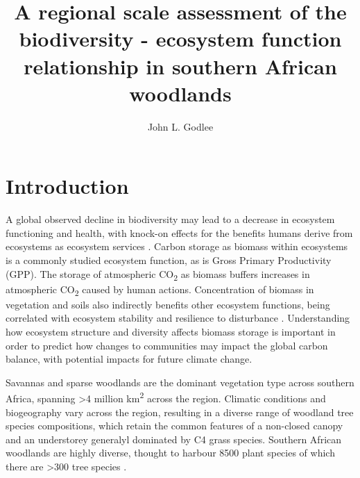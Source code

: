 \documentclass[12pt,english,a4paper]{report}
\newcommand{\textapprox}{\raisebox{0.5ex}{\texttildelow}}
\begin{document}
\title{A regional scale assessment of the biodiversity - ecosystem function relationship in southern African woodlands}
\author{John L. Godlee}
\maketitle
\tableofcontents
%

\section{Introduction}

A global observed decline in biodiversity may lead to a decrease in ecosystem functioning and health, with knock-on effects for the benefits humans derive from ecosystems as ecosystem services \citep{}. Carbon storage as biomass within ecosystems is a commonly studied ecosystem function, as is Gross Primary Productivity (GPP). The storage of atmospheric CO\textsubscript{2} as biomass buffers increases in atmospheric CO\textsubscript{2} caused by human actions. Concentration of biomass in vegetation and soils also indirectly benefits other ecosystem functions, being correlated with ecosystem stability and resilience to disturbance \citep{}. Understanding how ecosystem structure and diversity affects biomass storage is important in order to predict how changes to communities may impact the global carbon balance, with potential impacts for future climate change.

Savannas and sparse woodlands are the dominant vegetation type across southern Africa, spanning \textgreater{}4 million km\textsuperscript{2} across the region. Climatic conditions and biogeography vary across the region, resulting in a diverse range of woodland tree species compositions, which retain the common features of a non-closed canopy and an understorey generalyl dominated by C4 grass species. Southern African woodlands are highly diverse, thought to harbour \textapprox{}8500 plant species of which there are \textgreater{}300 tree species \citep{Frost1996}.
\end{document}
